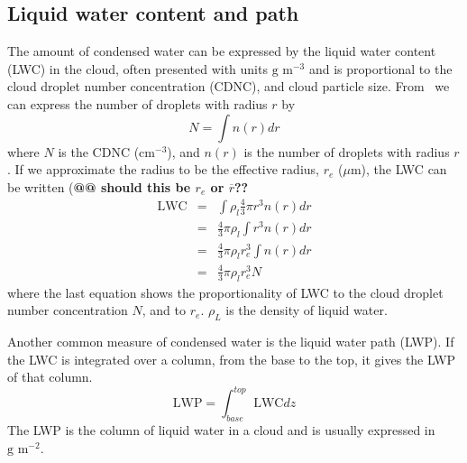 \subsection{Liquid water content and path}
The amount of condensed water can be expressed by the liquid water content (LWC) in the cloud, often presented with units $\text{g~m}^{-3}$ and is proportional to the cloud droplet number concentration (CDNC), and cloud particle size. From~\citet{Rogers1989} we can express the number of droplets with radius $r$ by
\begin{equation}
N = \int n(r) dr
\end{equation}
where $N$ is the CDNC ($\text{cm}^{-3}$), and $n(r)$ is the number of droplets with radius $r$. If we approximate the radius to be the effective radius, $r_e$ ($\mu\text{m}$), the LWC can be written (\textbf{@@ should this be $r_e$ or $\overline{r}$??}
\begin{eqnarray}
\text{LWC} &=& \int \rho_l \frac{4}{3} \pi r^3 n(r) dr\\
&=& \frac{4}{3} \pi \rho_l \int r^3 n(r) dr\\
&=& \frac{4}{3} \pi \rho_l r_e^3 \int n(r) dr\\
&=& \frac{4}{3} \pi \rho_l r_e^3 N 
\label{eqn:LWC}
\end{eqnarray}
where the last equation shows the proportionality of LWC to the cloud droplet number concentration $N$, and to $r_e$. $\rho_L$ is the density of liquid water.

Another common measure of condensed water is the liquid water path (LWP).
If the LWC is integrated over a column, from the base to the top, it gives the LWP of that column.
\begin{equation}
\text{LWP} = \int_{base}^{top} \text{LWC} dz
\end{equation}
The LWP is the column of liquid water in a cloud and is usually expressed in $\text{g~m}^{-2}$.

